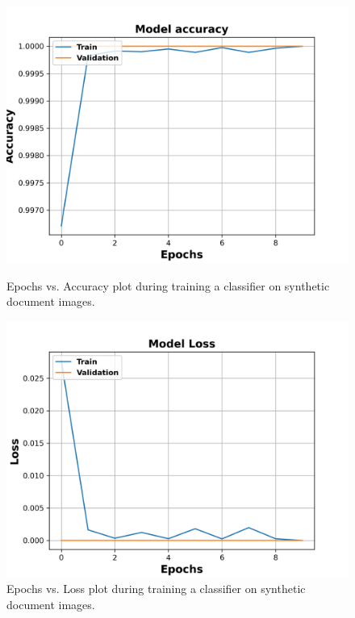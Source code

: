 \begin{figure}[H]
  \centering
  \begin{minipage}[b]{0.45\textwidth}
    \includegraphics[width=\textwidth]{images/Evaluation/Synthetic_Data_Classifier_2021-05-31_16-40-33_Accuracy.png}
    \caption[Epochs vs. Accuracy plot during training a classifier on synthetic document images.]{Epochs vs. Accuracy plot during training a classifier on synthetic document images.}
    \label{fig:SyntheticClassifierAcc}
  \end{minipage}
  \hfill
  \begin{minipage}[b]{0.45\textwidth}
    \includegraphics[width=\textwidth]{images/Evaluation/Synthetic_Data_Classifier_2021-05-31_16-40-33_Loss.png}
    \caption[Epochs vs. Loss plot during training a classifier on synthetic document images.]{Epochs vs. Loss plot during training a classifier on synthetic document images.}
    \label{fig:SyntheticClassifierLoss}
  \end{minipage}
\end{figure}

